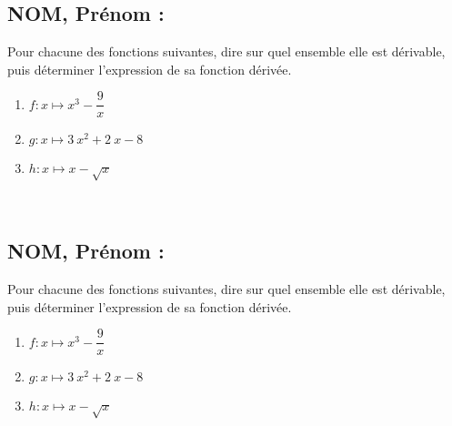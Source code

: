 \documentclass[a4paper,11pt,exos]{nsi} %
\begin{document}
\subsection*{NOM, Prénom : \dotfill} 


\maketitle




\begin{exercice}
    Pour chacune des fonctions suivantes, dire sur quel ensemble elle est dérivable, puis déterminer l'expression de sa fonction dérivée.
    \begin{multicols}{3}
        \begin{enumerate}
            \item $f:x\longmapsto { x}^{3}-\dfrac{9}{{ x}}$
        
            \item $g:x\longmapsto 3~{ x}^{2}+2~ x-8$
            \item $h:x\longmapsto x-\sqrt{ x}$
        \end{enumerate}
    \end{multicols}
    
\end{exercice}
\\



\subsection*{NOM, Prénom : \dotfill} 


\maketitle




\begin{exercice}
    Pour chacune des fonctions suivantes, dire sur quel ensemble elle est dérivable, puis déterminer l'expression de sa fonction dérivée.
    \begin{multicols}{3}
        \begin{enumerate}
            \item $f:x\longmapsto { x}^{3}-\dfrac{9}{{ x}}$
        
            \item $g:x\longmapsto 3~{ x}^{2}+2~ x-8$
            \item $h:x\longmapsto x-\sqrt{ x}$
        \end{enumerate}
    \end{multicols}
    
\end{exercice}

\end{document}
